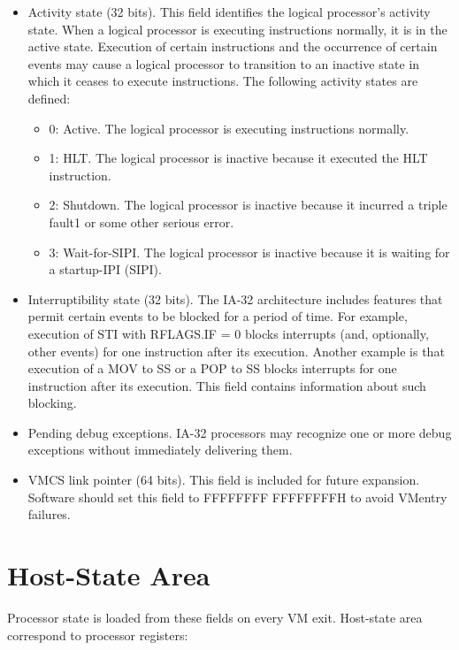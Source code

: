 \documentclass[10pt,draftclsnofoot,journal,compsoc,onecolumn]{IEEEtran}
\begin{document}
	\begin{itemize}
		\item Activity state (32 bits). This field identifies the logical processor’s activity state. When a logical processor is executing instructions normally, it is in the active state. Execution of certain instructions and the occurrence of certain events may cause a logical processor to transition to an inactive state in which it ceases to execute instructions. The following activity states are defined:
		
		\begin{itemize}
			\item 0: Active. The logical processor is executing instructions normally.
			\item 1: HLT. The logical processor is inactive because it executed the HLT instruction.
			\item 2: Shutdown. The logical processor is inactive because it incurred a triple fault1 or some other serious error.
			\item 3: Wait-for-SIPI. The logical processor is inactive because it is waiting for a startup-IPI (SIPI).
		\end{itemize}
		
		\item Interruptibility state (32 bits). The IA-32 architecture includes features that permit certain events to be blocked for a period of time. For example, execution of STI with RFLAGS.IF = 0 blocks interrupts (and, optionally, other events) for one instruction after its execution. Another example is that execution of a MOV to SS or a POP to SS blocks interrupts for one instruction after its execution. This field contains information about such blocking.
		\item Pending debug exceptions. IA-32 processors may recognize one or more debug exceptions without immediately delivering them.
		\item VMCS link pointer (64 bits). This field is included for future expansion. Software should set this field to FFFFFFFF FFFFFFFFH to avoid VMentry failures.
	\end{itemize}
	
	\section{Host-State Area}
	Processor state is loaded from these fields on every VM exit. Host-state area correspond to processor registers:
	
\end{document}
